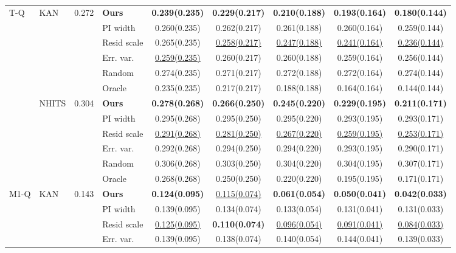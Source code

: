\begin{table}[t]
\begin{tabular}{@{}llrlccccc@{}}
\midrule
T-Q & KAN & 0.272 & \textbf{Ours} & \textbf{0.239(0.235)} & \textbf{0.229(0.217)} & \textbf{0.210(0.188)} & \textbf{0.193(0.164)} & \textbf{0.180(0.144)} \\
 &  &  & PI width & 0.260(0.235) & 0.262(0.217) & 0.261(0.188) & 0.260(0.164) & 0.259(0.144) \\
 &  &  & Resid scale & 0.265(0.235) & \underline{0.258(0.217)} & \underline{0.247(0.188)} & \underline{0.241(0.164)} & \underline{0.236(0.144)} \\
 &  &  & Err. var. & \underline{0.259(0.235)} & 0.260(0.217) & 0.260(0.188) & 0.259(0.164) & 0.256(0.144) \\
\cmidrule(lr){4-9}
 &  &  & Random & 0.274(0.235) & 0.271(0.217) & 0.272(0.188) & 0.272(0.164) & 0.274(0.144) \\
 &  &  & Oracle & 0.235(0.235) & 0.217(0.217) & 0.188(0.188) & 0.164(0.164) & 0.144(0.144) \\
\cmidrule(lr){2-9}
 & NHITS & 0.304 & \textbf{Ours} & \textbf{0.278(0.268)} & \textbf{0.266(0.250)} & \textbf{0.245(0.220)} & \textbf{0.229(0.195)} & \textbf{0.211(0.171)} \\
 &  &  & PI width & 0.295(0.268) & 0.295(0.250) & 0.295(0.220) & 0.293(0.195) & 0.293(0.171) \\
 &  &  & Resid scale & \underline{0.291(0.268)} & \underline{0.281(0.250)} & \underline{0.267(0.220)} & \underline{0.259(0.195)} & \underline{0.253(0.171)} \\
 &  &  & Err. var. & 0.292(0.268) & 0.294(0.250) & 0.294(0.220) & 0.293(0.195) & 0.290(0.171) \\
\cmidrule(lr){4-9}
 &  &  & Random & 0.306(0.268) & 0.303(0.250) & 0.304(0.220) & 0.304(0.195) & 0.307(0.171) \\
 &  &  & Oracle & 0.268(0.268) & 0.250(0.250) & 0.220(0.220) & 0.195(0.195) & 0.171(0.171) \\
\midrule
M1-Q & KAN & 0.143 & \textbf{Ours} & \textbf{0.124(0.095)} & \underline{0.115(0.074)} & \textbf{0.061(0.054)} & \textbf{0.050(0.041)} & \textbf{0.042(0.033)} \\
 &  &  & PI width & 0.139(0.095) & 0.134(0.074) & 0.133(0.054) & 0.131(0.041) & 0.131(0.033) \\
 &  &  & Resid scale & \underline{0.125(0.095)} & \textbf{0.110(0.074)} & \underline{0.096(0.054)} & \underline{0.091(0.041)} & \underline{0.084(0.033)} \\
 &  &  & Err. var. & 0.139(0.095) & 0.138(0.074) & 0.140(0.054) & 0.144(0.041) & 0.139(0.033) \\

\end{tabular}
\end{table}
